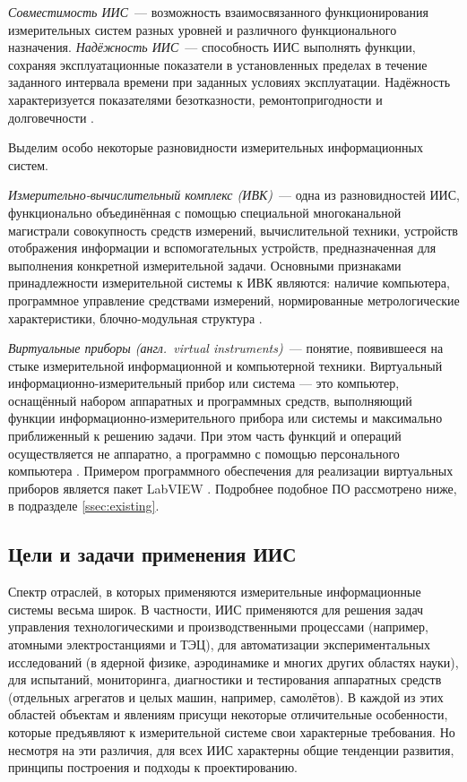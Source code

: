 \documentclass[a4paper, 14pt, titlepage]{extarticle}
\newcommand{\eng}[1]{\foreignlanguage{english}{#1}}
\newcommand{\term}[1]{\emph{#1}}
\begin{document}
  \term{Совместимость ИИС}~--- возможность взаимосвязанного функционирования измерительных систем разных уровней и
  различного функционального назначения.
  \term{Надёжность ИИС}~--- способность ИИС выполнять функции, сохраняя эксплуатационные показатели
  в установленных пределах в течение заданного интервала времени при заданных условиях эксплуатации.
  Надёжность характеризуется показателями безотказности, ремонтопригодности и долговечности
  \cite[с.~5--7]{rannev-iis}.

  Выделим особо некоторые разновидности измерительных информационных систем.

  \term{Измерительно-вычислительный комплекс (ИВК)}~--- одна из разновидностей ИИС, функционально
  объединённая с помощью специальной многоканальной магистрали совокупность средств
  измерений, вычислительной техники, устройств отображения информации и вспомогательных устройств,
  предназначенная для выполнения конкретной измерительной задачи. Основными признаками
  принадлежности измерительной системы к ИВК являются: наличие компьютера, программное управление
  средствами измерений, нормированные метрологические характеристики, блочно-модульная структура \cite[с.~225]{rannev-iis}.

  \term{Виртуальные приборы (англ.~\eng{virtual instruments})}~--- понятие, появившееся на стыке
  измерительной информационной и компьютерной техники. Виртуальный информационно-измерительный
  прибор или система — это компьютер, оснащённый набором аппаратных и программных средств,
  выполняющий функции информационно-измерительного прибора или системы и максимально приближенный к
  решению задачи. При этом часть функций и операций осуществляется не аппаратно, а программно с
  помощью персонального компьютера \cite[с.~209]{rannev-iis}. Примером программного обеспечения для
  реализации виртуальных приборов является пакет LabVIEW \cite{lavrov-labview}. Подробнее подобное
  ПО рассмотрено ниже, в подразделе \ref{ssec:existing}.

  \subsection{Цели и задачи применения ИИС}\label{ssec:iis-goals}

  Спектр отраслей, в которых применяются измерительные информационные системы весьма широк.
  В частности, ИИС применяются для решения задач управления технологическими и
  производственными процессами (например, атомными электростанциями и ТЭЦ), для автоматизации экспериментальных
  исследований (в ядерной физике, аэродинамике и многих других областях науки), для испытаний, мониторинга,
  диагностики и тестирования аппаратных средств (отдельных агрегатов и целых машин, например, самолётов). В
  каждой из этих областей объектам и явлениям присущи некоторые отличительные особенности, которые
  предъявляют к измерительной системе свои характерные требования. Но несмотря на эти различия,
  для всех ИИС характерны общие тенденции развития, принципы построения и подходы к проектированию.
\end{document}
